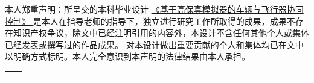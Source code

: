 
\begin{declarationzh}
		
本人郑重声明：所呈交的本科毕业设计 \uline{ 《基于高保真模拟器的车辆与飞行器协同控制》 } 是本人在指导老师的指导下，独立进行研究工作所取得的成果，成果不存在知识产权争议，除文中已经注明引用的内容外，本设计不含任何其他个人或集体已经发表或撰写过的作品成果。
对本设计做出重要贡献的个人和集体均已在文中以明确方式标明。本人完全意识到本声明的法律结果由本人承担。
	
	\vspace{30pt}
	\begin{tabular}{ll}
		\hspace{240pt} \makebox[4em][s]{作者签名：  雷宇杰  }& \underline{\makebox[100pt][c]{  }} \\
		\hspace{240pt} \makebox[4em][s]{日\qquad 期:}	 &
		\underline{\makebox[100pt][c]{\qquad2025年\quad5月\quad3日 }}\\
	\end{tabular}

	
	
\end{declarationzh}